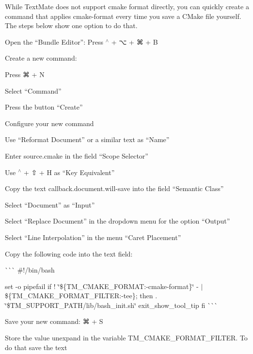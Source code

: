 While Text\+Mate does not support cmake format directly, you can quickly create a command that applies {\ttfamily cmake-\/format} every time you save a C\+Make file yourself. The steps below show one option to do that.


\begin{DoxyEnumerate}
\item Open the “\+Bundle Editor”\+: Press {\ttfamily $^\wedge$} + {\ttfamily ⌥} + {\ttfamily ⌘} + {\ttfamily B}
\item Create a new command\+:
\begin{DoxyEnumerate}
\item Press {\ttfamily ⌘} + {\ttfamily N}
\item Select “\+Command”
\item Press the button “\+Create”
\end{DoxyEnumerate}
\item Configure your new command
\begin{DoxyEnumerate}
\item Use “\+Reformat Document” or a similar text as “\+Name”
\item Enter {\ttfamily source.\+cmake} in the field “\+Scope Selector”
\item Use {\ttfamily $^\wedge$} + {\ttfamily ⇧} + {\ttfamily H} as “\+Key Equivalent”
\item Copy the text {\ttfamily callback.\+document.\+will-\/save} into the field “\+Semantic Class”
\item Select “\+Document” as “\+Input”
\item Select “\+Replace Document” in the dropdown menu for the option “\+Output”
\item Select “\+Line Interpolation” in the menu “\+Caret Placement”
\item Copy the following code into the text field\+:

\`{}\`{}\`{} \#!/bin/bash

set -\/o pipefail if ! \char`\"{}\$\{\+T\+M\+\_\+\+C\+M\+A\+K\+E\+\_\+\+F\+O\+R\+M\+A\+T\+:-\/cmake-\/format\}\char`\"{} -\/ $\vert$ \$\{T\+M\+\_\+\+C\+M\+A\+K\+E\+\_\+\+F\+O\+R\+M\+A\+T\+\_\+\+F\+I\+L\+T\+ER\+:-\/tee\}; then . \char`\"{}\$\+T\+M\+\_\+\+S\+U\+P\+P\+O\+R\+T\+\_\+\+P\+A\+T\+H/lib/bash\+\_\+init.\+sh\char`\"{} exit\+\_\+show\+\_\+tool\+\_\+tip fi \`{}\`{}\`{}
\item Save your new command\+: {\ttfamily ⌘} + {\ttfamily S}
\item Store the value {\ttfamily unexpand} in the variable {\ttfamily T\+M\+\_\+\+C\+M\+A\+K\+E\+\_\+\+F\+O\+R\+M\+A\+T\+\_\+\+F\+I\+L\+T\+ER}. To do that save the text
\end{DoxyEnumerate}
\end{DoxyEnumerate}



